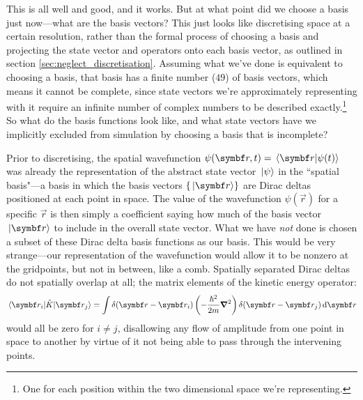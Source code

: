 This is all well and good, and it works. But at what point did we choose a basis just now---what are the basis vectors? This just looks like discretising space at a certain resolution, rather than the formal process of choosing a basis and projecting the state vector and operators onto each basis vector, as outlined in section \ref{sec:neglect_discretisation}. Assuming what we've done is equivalent to choosing a basis, that basis has a finite number ($49$) of basis vectors, which means it cannot be complete, since state vectors we're approximately representing with it require an infinite number of complex numbers to be described exactly.\footnote{One for each position within the two dimensional space we're representing.} So what do the basis functions look like, and what state vectors have we implicitly excluded from simulation by choosing a basis that is incomplete?

Prior to discretising, the spatial wavefunction $\psi(\vec r, t) = \braket{\vec r}{\psi(t)}$ was already the representation of the abstract state vector $\ket{\psi}$ in the ``spatial basis"---a basis in which the basis vectors $\{\ket{\vec r}\}$ are Dirac deltas positioned at each point in space. The value of the wavefunction $\psi(\vec r)$ for a specific $\vec r$ is then simply a coefficient saying how much of the basis vector $\ket{\vec r}$ to include in the overall state vector. What we have \emph{not} done is chosen a subset of these Dirac delta basis functions as our basis. This would be very strange---our representation of the wavefunction would allow it to be nonzero at the gridpoints, but not in between, like a comb. Spatially separated Dirac deltas do not spatially overlap at all; the matrix elements of the kinetic energy operator:
\begin{align}
\matrixel{\vec r_i}{\hat K}{\vec r_j} = \int \delta(\vec r - \vec r_i)\left(-\frac{\hbar^2}{2m}\grad^2\right)\delta(\vec r - \vec r_j)\,\dd \vec r
\end{align}
would all be zero for $i\neq j$, disallowing any flow of amplitude from one point in space to another by virtue of it not being able to pass through the intervening points.

